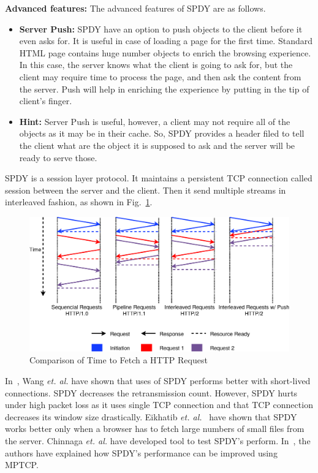\noindent \textbf{Advanced features:} The advanced features of SPDY are as follows. 
\begin{itemize}
    \item \textbf{Server Push:} SPDY have an option to push objects to the client before it even asks for. It is useful in case of loading a page for the first time. Standard HTML page contains huge number objects to enrich the browsing experience. In this case, the server knows what the client is going to ask for, but the client may require time to process the page, and then ask the content from the server. Push will help in enriching the experience by putting in the tip of client's finger.
    \item \textbf{Hint:} Server Push is useful, however, a client may not require all of the objects as it may be in their cache. So, SPDY provides a header filed to tell the client what are the object it is supposed to ask and the server will be ready to serve those.
\end{itemize}
SPDY is a session layer protocol. It maintains a persistent TCP connection called session between the server and the client. Then it send multiple streams in interleaved fashion, as shown in Fig.~\ref{fig:http-timing-diagram}\cite{quiclookathttp}.

\begin{figure}[h]
    \centering
    \includegraphics[width=0.8\linewidth]{img/spdy/http-timing-diagram}
    \caption{Comparison of Time to Fetch a HTTP Request\cite{quiclookathttp}}
    \label{fig:http-timing-diagram}
\end{figure}


In~\cite{howspeedis}, Wang \textit{et. al.} have shown that uses of SPDY performs better with short-lived connections. SPDY decreases the retransmission count. However, SPDY hurts under high packet loss as it uses single TCP connection and that TCP connection decreases its window size drastically.  Eikhatib \textit{et. al.}~\cite{canspdymake} have shown that SPDY works better only when a browser has to fetch large numbers of small files from the server. Chinnaga \textit{et. al.}\cite{scalabilitySPDY} have developed tool to test SPDY's perform. In~\cite{han2015anatomy}, the authors have explained how SPDY's performance can be improved using MPTCP.

